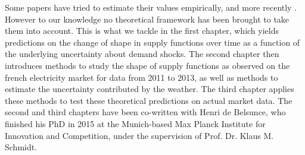 Some papers have tried to estimate their values empirically, \cite{wolak2007quantifying} and more recently \cite{reguant2011welfare}. However to our knowledge no theoretical framework has been brought to take them into account. This is what we tackle in the first chapter, which yields predictions on the change of shape in supply functions over time as a function of the underlying uncertainty about demand shocks. The second chapter then introduces methods to study the shape of supply functions as observed on the french electricity market for data from 2011 to 2013, as well as methods to estimate the uncertainty contributed by the weather. The third chapter applies these methods to test these theoretical predictions on actual market data. The second and third chapters have been co-written with Henri de Belsunce, who finished his PhD in 2015 at the Munich-based Max Planck Institute for Innovation and Competition, under the supervision of Prof. Dr. Klaus M. Schmidt.

%
%








%


 